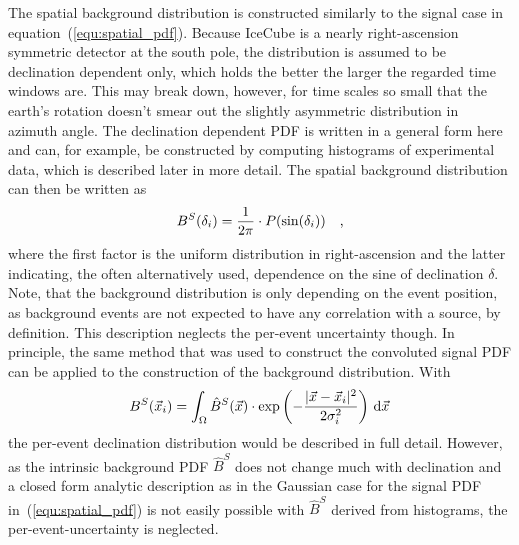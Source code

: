 The spatial background distribution is constructed similarly to the signal case in equation~(\ref{equ:spatial_pdf}).
Because IceCube is a nearly right-ascension symmetric detector at the south pole, the distribution is assumed to be declination dependent only, which holds the better the larger the regarded time windows are.
This may break down, however, for time scales so small that the earth's rotation doesn't smear out the slightly asymmetric distribution in azimuth angle.
The declination dependent PDF is written in a general form here and can, for example, be constructed by computing histograms of experimental data, which is described later in more detail.
The spatial background distribution can then be written as
\begin{equation}
  B^S(\delta_i) = \frac{1}{2\pi} \cdot P(\sin(\delta_i))
  \quad\text{,}
\end{equation}
where the first factor is the uniform distribution in right-ascension and the latter indicating, the often alternatively used, dependence on the sine of declination $\delta$.
Note, that the background distribution is only depending on the event position, as background  events are not expected to have any correlation with a source, by definition.
This description neglects the per-event uncertainty though.
In principle, the same method that was used to construct the convoluted signal PDF can be applied to the construction of the background distribution.
With
\begin{equation}
  B^S(\vec{x}_i) =
    \int_\Omega \hat{B}^S(\vec{x}) \cdot
      \exp\left(-\frac{|\vec{x}-\vec{x}_i|^2}{2\sigma_i^2}\right)
      \,\mathrm{d}\vec{x}
\end{equation}
the per-event declination distribution would be described in full detail.
However, as the intrinsic background PDF $\hat{B}^S$ does not change much with declination and a closed form analytic description as in the Gaussian case for the signal PDF in~(\ref{equ:spatial_pdf}) is not easily possible with $\hat{B}^S$ derived from histograms, the per-event-uncertainty is neglected.


